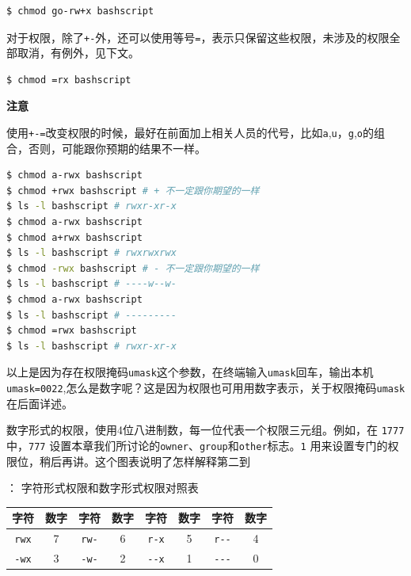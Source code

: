 \documentclass[doctor,openright,twoside]{sjtuthesis}
\newcommand{\passthrough}[1]{#1}
\theoremstyle{plain}
\theoremstyle{definition}
\theoremstyle{remark}
\theoremstyle{ocrenumbox}
\theoremstyle{plain}
\begin{document}
\begin{lstlisting}[language=bash]
$ chmod go-rw+x bashscript
\end{lstlisting}

对于权限，除了\passthrough{\lstinline!+-!}外，还可以使用等号\passthrough{\lstinline!=!}，表示只保留这些权限，未涉及的权限全部取消，有例外，见下文。

\begin{lstlisting}[language=bash]
$ chmod =rx bashscript
\end{lstlisting}

\textbf{注意}

使用\passthrough{\lstinline!+-=!}改变权限的时候，最好在前面加上相关人员的代号，比如\passthrough{\lstinline!a!},\passthrough{\lstinline!u!}，\passthrough{\lstinline!g!},\passthrough{\lstinline!o!}的组合，否则，可能跟你预期的结果不一样。

\begin{lstlisting}[language=bash]
$ chmod a-rwx bashscript
$ chmod +rwx bashscript # + 不一定跟你期望的一样
$ ls -l bashscript # rwxr-xr-x
$ chmod a-rwx bashscript
$ chmod a+rwx bashscript
$ ls -l bashscript # rwxrwxrwx
$ chmod -rwx bashscript # - 不一定跟你期望的一样
$ ls -l bashscript # ----w--w-
$ chmod a-rwx bashscript
$ ls -l bashscript # ---------
$ chmod =rwx bashscript
$ ls -l bashscript # rwxr-xr-x
\end{lstlisting}

以上是因为存在权限掩码\passthrough{\lstinline!umask!}这个参数，在终端输入\passthrough{\lstinline!umask!}回车，输出本机\passthrough{\lstinline!umask=0022!},怎么是数字呢？这是因为权限也可用用数字表示，关于权限掩码\passthrough{\lstinline!umask!}在后面详述。

数字形式的权限，使用4位八进制数，每一位代表一个权限三元组。例如，在
\passthrough{\lstinline!1777!} 中，\passthrough{\lstinline!777!}
设置本章我们所讨论的\passthrough{\lstinline!owner!}、\passthrough{\lstinline!group!}和\passthrough{\lstinline!other!}标志。\passthrough{\lstinline!1!}
用来设置专门的权限位，稍后再讲。这个图表说明了怎样解释第二到

： 字符形式权限和数字形式权限对照表

\begin{longtable}[]{@{}cccccccc@{}}
\toprule
\textbf{字符} & \textbf{数字} & \textbf{字符} & \textbf{数字} &
\textbf{字符} & \textbf{数字} & \textbf{字符} &
\textbf{数字}\tabularnewline
\midrule
\endhead
\passthrough{\lstinline!rwx!} & 7 & \passthrough{\lstinline!rw-!} & 6 &
\passthrough{\lstinline!r-x!} & 5 & \passthrough{\lstinline!r--!} &
4\tabularnewline
\passthrough{\lstinline!-wx!} & 3 & \passthrough{\lstinline!-w-!} & 2 &
\passthrough{\lstinline!--x!} & 1 & \passthrough{\lstinline!---!} &
0\tabularnewline
\bottomrule
\end{longtable}
\end{document}
